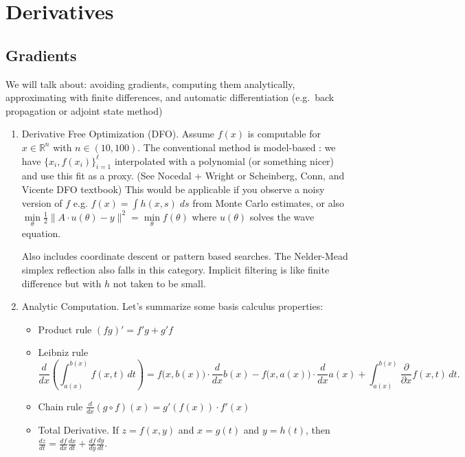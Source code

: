 \documentclass[english, 11pt]{article}
\begin{document}
\section{Derivatives}

\subsection{Gradients}

We will talk about: avoiding gradients, computing them analytically, approximating with finite differences, and automatic differentiation (e.g.\ back propagation or adjoint state method)


\begin{enumerate}

\item Derivative Free Optimization (DFO). Assume $f(x)$ is computable for $x \in \mathbb{R}^n$ with $n \in (10,100)$. The conventional method is model-based : we have $\{x_i,f(x_i)\}_{i=1}^\ell$ interpolated with a polynomial (or something nicer) and use this fit as a proxy. (See Nocedal + Wright or Scheinberg, Conn, and Vicente DFO textbook) This would be applicable if you observe a noisy version of $f$ e.g. $f(x) = \int h(x,s) \; ds$ from Monte Carlo estimates, or also $\min \limits_{\theta} \frac{1}{2} \|A \cdot u(\theta) - y\|^2 = \min \limits_\theta f(\theta)$ where $u(\theta)$ solves the wave equation.

Also includes coordinate descent or pattern based searches. The Nelder-Mead simplex reflection also falls in this category. Implicit filtering is like finite difference but with $h$ not taken to be small.


\item Analytic Computation. Let's summarize some basis calculus properties:
\begin{itemize}
\item Product rule $(fg)' = f'g + g' f$
\item Leibniz rule
\[
{\displaystyle {\frac {d}{dx}}\left(\int _{a(x)}^{b(x)}f(x,t)\,dt\right)=f{\big (}x,b(x){\big )}\cdot {\frac {d}{dx}}b(x)-f{\big (}x,a(x){\big )}\cdot {\frac {d}{dx}}a(x)+\int _{a(x)}^{b(x)}{\frac {\partial }{\partial x}}f(x,t)\,dt.}
\]

\item Chain rule $\frac{d}{dx} (g \circ f)(x) = g'(f(x)) \cdot f'(x)$

\item Total Derivative. If $z = f(x,y)$ and $x = g(t)$ and $y = h(t)$, then $\frac{dz}{dt} = \frac{df}{dx} \frac{dx}{dt} + \frac{df}{dy} \frac{dy}{dt}$.


\end{itemize}
\end{enumerate}
\end{document}
